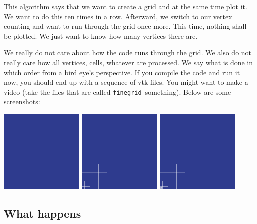 \noindent
This algorithm says that we want to create a grid and at the same time plot it.
We want to do this ten times in a row.
Afterward, we switch to our vertex counting and want to run through the grid
once more. 
This time, nothing shall be plotted.
We just want to know how many vertices there are.


We really do not care about how the code runs through the grid.
We also do not really care how all vertices, cells, whatever are processed.
We say what is done in which order from a bird eye's perspective.
If you compile the code and run it now, you should end up with a sequence of vtk
files. 
You might want to make a video (take the files that are called
\texttt{finegrid-}something).
Below are some screenshots:


\begin{center}
  \includegraphics[width=0.3\textwidth]{3_basics/grid00.png}
  \includegraphics[width=0.3\textwidth]{3_basics/grid01.png}
  \includegraphics[width=0.3\textwidth]{3_basics/grid02.png}
\end{center}


\subsection{What happens}


